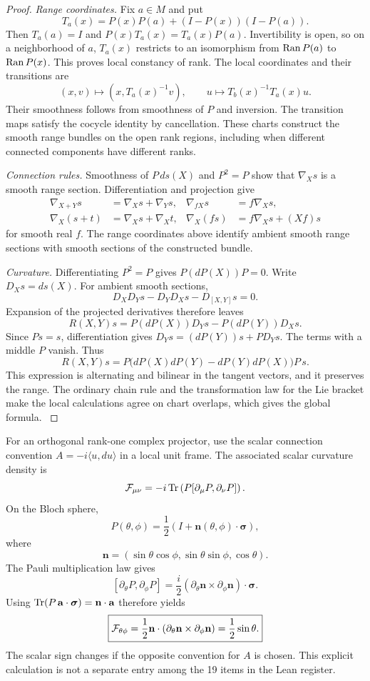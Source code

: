 \begin{proof}\label{core:proof:013}
\textit{Range coordinates.} Fix $a\in M$ and put
\[
T_a(x)=P(x)P(a)+(I-P(x))(I-P(a)).
\]
Then $T_a(a)=I$ and $P(x)T_a(x)=T_a(x)P(a)$. Invertibility is open, so on a neighborhood of $a$, $T_a(x)$ restricts to an isomorphism from $\operatorname{Ran} P(a)$ to $\operatorname{Ran} P(x)$. This proves local constancy of rank. The local coordinates and their transitions are
\[
(x,v)\longmapsto (x,T_a(x)^{-1}v),\qquad
u\longmapsto T_b(x)^{-1}T_a(x)u.
\]
Their smoothness follows from smoothness of $P$ and inversion. The transition maps satisfy the cocycle identity by cancellation. These charts construct the smooth range bundles on the open rank regions, including when different connected components have different ranks.

\textit{Connection rules.} Smoothness of $P\,ds(X)$ and $P^2=P$ show that $\nabla_Xs$ is a smooth range section. Differentiation and projection give
\[
\begin{aligned}
\nabla_{X+Y}s&=\nabla_Xs+\nabla_Ys,&
\nabla_{fX}s&=f\nabla_Xs,\\
\nabla_X(s+t)&=\nabla_Xs+\nabla_Xt,&
\nabla_X(fs)&=f\nabla_Xs+(Xf)s
\end{aligned}
\]
for smooth real $f$. The range coordinates above identify ambient smooth range sections with smooth sections of the constructed bundle.

\textit{Curvature.} Differentiating $P^2=P$ gives $P(dP(X))P=0$. Write $D_Xs=ds(X)$. For ambient smooth sections,
\[
D_XD_Ys-D_YD_Xs-D_{[X,Y]}s=0.
\]
Expansion of the projected derivatives therefore leaves
\[
R(X,Y)s=P(dP(X))D_Ys-P(dP(Y))D_Xs.
\]
Since $Ps=s$, differentiation gives $D_Ys=(dP(Y))s+PD_Ys$. The terms with a middle $P$ vanish. Thus
\[
R(X,Y)s=P\bigl(dP(X)dP(Y)-dP(Y)dP(X)\bigr)P\,s.
\]
This expression is alternating and bilinear in the tangent vectors, and it preserves the range. The ordinary chain rule and the transformation law for the Lie bracket make the local calculations agree on chart overlaps, which gives the global formula.
\label{core:proof:013:end}\end{proof}

For an orthogonal rank-one complex projector, use the scalar connection convention $A=-i\langle u,du\rangle$ in a local unit frame. The associated scalar curvature density is
\[
\cF_{\mu\nu}
=-i\Tr\left(P[\partial_\mu P,\partial_\nu P]\right).
\]
On the Bloch sphere,
\[
P(\theta,\phi)
=
\frac12\left(I+\mathbf n(\theta,\phi)\cdot\boldsymbol\sigma\right),
\]
where
\[
\mathbf n=(\sin\theta\cos\phi,\sin\theta\sin\phi,\cos\theta).
\]
The Pauli multiplication law gives
\[
[\partial_\theta P,\partial_\phi P]
=\frac{i}{2}(\partial_\theta\mathbf n\mathbin{\times}\partial_\phi\mathbf n)\cdot\boldsymbol\sigma.
\]
Using $\Tr(P\,\mathbf a\cdot\boldsymbol\sigma)=\mathbf n\cdot\mathbf a$ therefore yields
\[
\boxed{\cF_{\theta\phi}
=\frac12\mathbf n\cdot(\partial_\theta\mathbf n\mathbin{\times}\partial_\phi\mathbf n)
=\frac12\sin\theta.}
\]
The scalar sign changes if the opposite convention for $A$ is chosen. This explicit calculation is not a separate entry among the 19 items in the Lean register.

